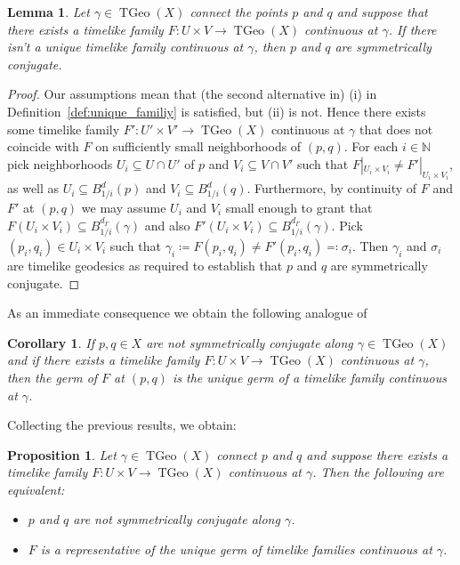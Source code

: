 \documentclass[a4paper,11pt]{article}
\numberwithin{equation}{section}
\theoremstyle{plain}
\newtheorem{Proposition}[Definition]{Proposition}
\newtheorem{Lemma}[Definition]{Lemma}
\newtheorem{Corollary}[Definition]{Corollary}
\theoremstyle{definition}
\newcommand{\N}{\mathbb N}
\DeclareMathOperator{\TGeo}{TGeo}
\begin{document}
\begin{Lemma}\label{lem:no-unique-fam-conj-points} Let $\gamma\in \TGeo(X)$ connect the points $p$ and $q$ and suppose that there exists a timelike family $F \colon U\times V \to \TGeo(X)$ continuous at $\gamma$. If there isn't a unique timelike family continuous at $\gamma$, then $p$ and $q$ are symmetrically conjugate. 
\end{Lemma}
\begin{proof} Our assumptions mean that (the second alternative in) (i) in Definition~\ref{def:unique_familiy} is satisfied, but (ii) is not. Hence there exists some timelike family $F' \colon U'\times V' \to \TGeo(X)$ continuous at $\gamma$ that does not coincide with $F$ on sufficiently small neighborhoods of $(p,q)$. For each $i\in \N$ pick neighborhoods $U_i\subseteq U\cap U'$ of $p$ and $V_i\subseteq V\cap V'$ such that $F|_{U_i\times V_i} \ne F'|_{U_i\times V_i}$, as well as
$U_i\subseteq B^d_{1/i}(p)$ and $V_i\subseteq B^d_{1/i}(q)$. Furthermore, by continuity of $F$ and $F'$ at $(p,q)$ we may assume 
$U_i$ and $V_i$ small enough to grant that $F(U_i\times V_i)
\subseteq B^{d_\Gamma}_{1/i}(\gamma)$ and also $F'(U_i\times V_i)
\subseteq B^{d_\Gamma}_{1/i}(\gamma)$. Pick $(p_i,q_i) \in U_i\times V_i$ such that
$\gamma_i \coloneqq F(p_i,q_i)\ne F'(p_i,q_i) \eqqcolon \sigma_i$. Then $\gamma_i$ and $\sigma_i$ are timelike
geodesics as required to establish that $p$ and $q$ are symmetrically conjugate.
\end{proof}


As an immediate consequence we obtain the following analogue of~\cite[Thm.\ 3.7]{shankar2009conjugate}
\begin{Corollary}\label{cor:not-sym-con-unique-germ}
If $p, q\in X$ are not symmetrically conjugate along $\gamma\in \TGeo(X)$ and if there exists a timelike family $F \colon U\times V \to \TGeo(X)$ continuous at $\gamma$, then the germ of $F$ at $(p,q)$ is the unique germ of a timelike family continuous at $\gamma$. 
\end{Corollary}

Collecting the previous results, we obtain:
\begin{Proposition}\label{prop:symm-conj-characterization} Let $\gamma\in \TGeo(X)$ connect $p$ and $q$ and suppose there exists a timelike family $F \colon U\times V \to \TGeo(X)$ continuous at $\gamma$. Then the following are equivalent:
\begin{itemize}
\item[(i)] $p$ and $q$ are not symmetrically conjugate along $\gamma$.
\item[(ii)] $F$ is a representative of the unique germ of timelike families continuous at $\gamma$.
\end{itemize}
\end{Proposition}
\end{document}
